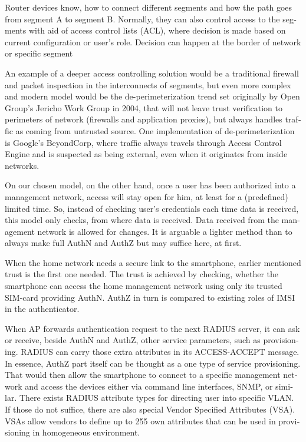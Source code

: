 \documentclass[12pt,a4paper,english]{tutthesis}
\begin{document}
\begin{otherlanguage}{english}
Router devices know, how to connect different segments and how the
path goes from segment A to segment B. Normally, they can also control
access to the segments with aid of access control lists (ACL), where
decision is made based on current configuration or user's role.
Decision can happen at the border of network or specific segment




An example of a deeper access controlling  solution would be a traditional firewall and packet
inspection in the interconnects of segments, but even more complex and modern model
would be the de-perimeterization trend set originally by Open Group's
Jericho Work Group\cite{jericho2004} in 2004, that will not leave trust verification to
perimeters of network (firewalls and application proxies), but 
always handles traffic as coming from untrusted source.
One implementation of de-perimeterization is 
Google's BeyondCorp\cite{2014-beyondcorp}, 
where traffic always travels through Access Control Engine
and is suspected as being external, even when it originates from
inside networks. 



On our chosen model, on the other hand, once a user has been authorized into a management network, access
will stay open for him, at least for a (predefined) limited time.
So, instead of checking user's credentials each time data is received,
this model only checks, from where data is received. 
Data received from the management network is allowed for changes.
It is arguable a lighter method than to always make 
full AuthN and AuthZ but may suffice here, at first.


When the home network needs a secure link to the smartphone, earlier
mentioned trust is the first one needed.  The trust is achieved by
checking, whether the smartphone can access the home management
network using only its trusted SIM-card providing AuthN. AuthZ in
turn is compared to existing roles of IMSI in the authenticator.




When AP forwards authentication request to the next RADIUS server, it
can ask or receive, beside AuthN and AuthZ, other service parameters,
such as provisioning. RADIUS can carry those extra attributes in its
ACCESS-ACCEPT message.  In essence, AuthZ part itself can be thought
as a one type of service provisioning.  That would then allow the
smartphone to connect to a specific management network and access the
devices either via command line interfaces, SNMP, or
similar\cite[p.4]{rfc5608}.
There exists RADIUS attribute types for directing user into specific
VLAN. If those do not suffice, there are also special Vendor Specified
Attributes (VSA). VSAs allow vendors to define up to 255 own
attributes that can be used in provisioning in homogeneous environment. 



\end{otherlanguage}
\end{document}
